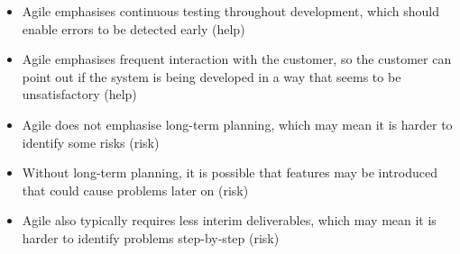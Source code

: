\documentclass[12pt,openany]{book}
\begin{document}
\begin{itemize}
    \begin{itemize}
        \item Agile emphasises continuous testing throughout development, which should enable errors to be detected early (help)
        \item Agile emphasises frequent interaction with the customer, so the customer can point out if the system is being developed in a way that seems to be unsatisfactory (help)
        \item Agile does not emphasise long-term planning, which may mean it is harder to identify some risks (risk)
        \item Without long-term planning, it is possible that features may be introduced that could cause problems later on (risk)
        \item Agile also typically requires less interim deliverables, which may mean it is harder to identify problems step-by-step (risk)
    \end{itemize}
\end{itemize}
\end{document}

